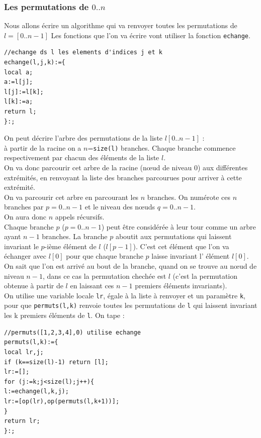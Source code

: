 \documentclass[a4paper,11pt]{book}
\begin{document}
\subsubsection{Les permutations de $0..n$}
Nous allons \'ecrire un algorithme qui va renvoyer toutes les permutations de 
$l=[0..n-1]$
Les fonctions que l'on va \'ecrire vont utiliser la fonction {\tt echange}.
\begin{verbatim}
//echange ds l les elements d'indices j et k
echange(l,j,k):={
local a;
a:=l[j];
l[j]:=l[k];
l[k]:=a;
return l;
}:;
\end{verbatim} 
On peut d\'ecrire l'arbre des permutations de la liste $l[0..n-1]$ :\\
\`a partir de la racine on a $n$={\tt size(l)} branches. Chaque branche
commence respectivement par chacun des \'el\'ements de la liste $l$.\\
On va donc parcourir cet arbre de la racine (n{\oe}ud de niveau 0) aux 
diff\'erentes extr\'emit\'es, en renvoyant la liste des branches parcourues 
pour arriver \`a cette extr\'emit\'e. \\
On va parcourir cet arbre en parcourant les $n$ branches. On num\'erote ces $n$
branches par $p=0..n-1$ et le niveau des n{\oe}uds $q=0..n-1$.\\
On aura donc $n$ appels r\'ecursifs.\\
Chaque branche $p$ ($p=0..n-1$) peut \^etre consid\'er\'ee \`a leur tour comme 
un arbre ayant $n-1$ branches. La branche $p$ aboutit aux permutations qui 
laissent invariant le $p$-i\`eme \'el\'ement de $l$ ($l[p-1]$). 
C'est cet \'el\'ement que l'on va \'echanger avec $l[0]$ pour que chaque 
branche $p$  laisse invariant l' \'el\'ement  $l[0]$.\\
On sait que l'on est arriv\'e au bout de la branche, quand on se trouve au
 n{\oe}ud de niveau $n-1$, dans ce cas la permutation chech\'ee est $l$ (c'est 
la permutation obtenue \`a partir de $l$ en laissant ces $n-1$ premiers 
\'el\'ements invariants).\\
On utilise une variable locale {\tt lr}, \'egale \`a la liste \`a renvoyer et 
un param\`etre {\tt k}, pour que {\tt permuts(l,k)} renvoie toutes les 
permutations de {\tt l} qui laissent invariant les k premiers \'el\'ements de 
{\tt l}. On tape :
\begin{verbatim}
//permuts([1,2,3,4],0) utilise echange 
permuts(l,k):={
local lr,j;
if (k==size(l)-1) return [l];
lr:=[];
for (j:=k;j<size(l);j++){
l:=echange(l,k,j);
lr:=[op(lr),op(permuts(l,k+1))];
}
return lr;
}:;
\end{verbatim}
\end{document}
